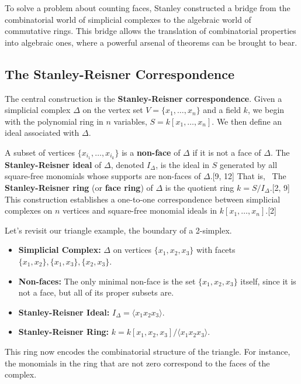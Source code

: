 \documentclass[11pt]{article}
\begin{document}
To solve a problem about counting faces, Stanley constructed a bridge from the combinatorial world of simplicial complexes to the algebraic world of commutative rings. This bridge allows the translation of combinatorial properties into algebraic ones, where a powerful arsenal of theorems can be brought to bear.

\subsection{The Stanley-Reisner Correspondence}

The central construction is the \textbf{Stanley-Reisner correspondence}. Given a simplicial complex $\Delta$ on the vertex set $V = \{x_1, \ldots, x_n\}$ and a field $k$, we begin with the polynomial ring in $n$ variables, $S = k[x_1, \ldots, x_n]$. We then define an ideal associated with $\Delta$.

A subset of vertices $\{x_{i_1}, \ldots, x_{i_k}\}$ is a \textbf{non-face} of $\Delta$ if it is not a face of $\Delta$. The \textbf{Stanley-Reisner ideal} of $\Delta$, denoted $I_\Delta$, is the ideal in $S$ generated by all square-free monomials whose supports are non-faces of $\Delta$.[9, 12] That is,
\
The \textbf{Stanley-Reisner ring} (or \textbf{face ring}) of $\Delta$ is the quotient ring $k = S / I_\Delta$.[2, 9] This construction establishes a one-to-one correspondence between simplicial complexes on $n$ vertices and square-free monomial ideals in $k[x_1, \ldots, x_n]$.[2]

Let's revisit our triangle example, the boundary of a 2-simplex.
\begin{itemize}
    \item \textbf{Simplicial Complex:} $\Delta$ on vertices $\{x_1, x_2, x_3\}$ with facets $\{x_1,x_2\}, \{x_1,x_3\}, \{x_2,x_3\}$.
    \item \textbf{Non-faces:} The only minimal non-face is the set $\{x_1, x_2, x_3\}$ itself, since it is not a face, but all of its proper subsets are.
    \item \textbf{Stanley-Reisner Ideal:} $I_\Delta = \langle x_1 x_2 x_3 \rangle$.
    \item \textbf{Stanley-Reisner Ring:} $k = k[x_1, x_2, x_3] / \langle x_1 x_2 x_3 \rangle$.
\end{itemize}

This ring now encodes the combinatorial structure of the triangle. For instance, the monomials in the ring that are not zero correspond to the faces of the complex.
\end{document}

